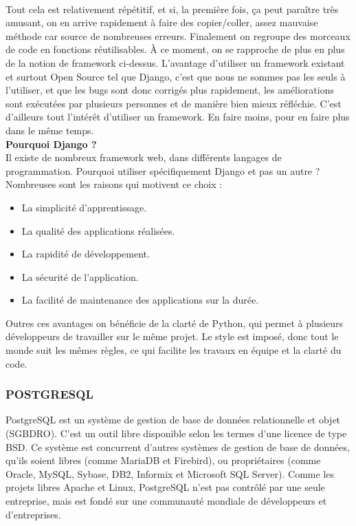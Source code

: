 	  \paragraph{}
	  Tout cela est relativement répétitif, et si, la première fois, ça peut paraître très amusant, on en arrive rapidement à faire des copier/coller, assez mauvaise méthode car source de nombreuses erreurs. Finalement on regroupe des morceaux de code en fonctions réutilisables. À ce moment, on se rapproche de plus en plus de la notion de framework ci-dessus. L'avantage d'utiliser un framework existant et surtout Open Source tel que Django, c'est que nous ne sommes pas les seuls à l'utiliser, et que les bugs sont donc corrigés plus rapidement, les améliorations sont exécutées par plusieurs personnes et de manière bien mieux réfléchie. C'est d'ailleurs tout l'intérêt d'utiliser un framework. En faire moins, pour en faire plus dans le même temps.\\
	  
	  
	  \textbf{Pourquoi Django ?}\\
	  Il existe de nombreux framework web, dans différents langages de programmation. Pourquoi utiliser spécifiquement Django et pas un autre ? Nombreuses sont les raisons qui motivent ce choix : 
	  \begin{itemize}
	    \item La simplicité d'apprentissage.
	    \item La qualité des applications réalisées.
	    \item La rapidité de développement.
	    \item La sécurité de l'application.
	    \item La facilité de maintenance des applications sur la durée.
	  \end{itemize}
	  Outres ces avantages on bénéficie de la clarté de Python, qui permet à plusieurs développeurs de travailler sur le même projet. Le style est imposé, donc tout le monde suit les mêmes règles, ce qui facilite les travaux en équipe et la clarté du code.
	  
	  \subsubsection{POSTGRESQL}
	    PostgreSQL est un système de gestion de base de données relationnelle et objet (SGBDRO). C'est un outil libre disponible selon les termes d'une licence de type BSD.
	    Ce système est concurrent d'autres systèmes de gestion de base de données, qu'ils soient libres (comme MariaDB et Firebird), ou propriétaires (comme Oracle, MySQL, Sybase, DB2, Informix et Microsoft SQL Server). Comme les projets libres Apache et Linux, PostgreSQL n'est pas contrôlé par une seule entreprise, mais est fondé sur une communauté mondiale de développeurs et d'entreprises.

